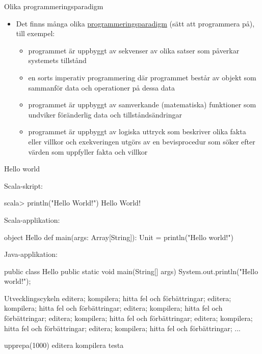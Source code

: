 \begin{Slide}{Olika programmeringsparadigm}
\begin{itemize}
\item Det finns många olika \href{https://en.wikipedia.org/wiki/Programming_paradigm}{programmeringsparadigm} (sätt att programmera på), till exempel:
\begin{itemize}\SlideFontSmall
\item {} programmet är uppbyggt av sekvenser av olika satser som påverkar systemets tillstånd
\item {} en sorts imperativ programmering där programmet består av objekt som sammanför data och operationer på dessa data
\item {} programmet är uppbyggt av samverkande (matematiska) funktioner som undviker föränderlig data och tillståndsändringar
\item {} programmet är uppbyggt av logiska uttryck som beskriver olika fakta eller villkor och exekveringen utgörs av en bevisprocedur som söker efter värden som uppfyller fakta och villkor
\end{itemize}
\end{itemize}
\end{Slide}


\begin{Slide}{Hello world}

Scala-skript:
\begin{REPLnonum}
scala> println("Hello World!")
Hello World!
\end{REPLnonum}

Scala-applikation:
\begin{Code}
object Hello {
  def main(args: Array[String]): Unit = println("Hello world!")
}
\end{Code}

Java-applikation:
\begin{Code}[language=Java]
public class Hello {
    public static void main(String[] args) {
        System.out.println("Hello world!");
    }
}
\end{Code}

\end{Slide}

\begin{Slide}{Utvecklingscykeln}
editera; kompilera; hitta fel och förbättringar; editera; kompilera; hitta fel och förbättringar; editera; kompilera; hitta fel och förbättringar; editera; kompilera; hitta fel och förbättringar; editera; kompilera; hitta fel och förbättringar; editera; kompilera; hitta fel och förbättringar; ...

\begin{Code}
upprepa(1000){
  editera
  kompilera
  testa
}
\end{Code}
\end{Slide}

